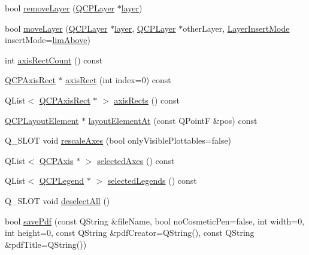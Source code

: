 \begin{DoxyCompactItemize}
\item 
bool \hyperlink{classQCustomPlot_a40f75e342c5eaab6a86066a42a0e2a94}{remove\-Layer} (\hyperlink{classQCPLayer}{\-Q\-C\-P\-Layer} $\ast$\hyperlink{classQCustomPlot_aac492da01782820454e9136a8db28182}{layer})
\item 
bool \hyperlink{classQCustomPlot_ae896140beff19424e9e9e02d6e331104}{move\-Layer} (\hyperlink{classQCPLayer}{\-Q\-C\-P\-Layer} $\ast$\hyperlink{classQCustomPlot_aac492da01782820454e9136a8db28182}{layer}, \hyperlink{classQCPLayer}{\-Q\-C\-P\-Layer} $\ast$other\-Layer, \hyperlink{classQCustomPlot_a75a8afbe6ef333b1f3d47abb25b9add7}{\-Layer\-Insert\-Mode} insert\-Mode=\hyperlink{classQCustomPlot_a75a8afbe6ef333b1f3d47abb25b9add7a062b0b7825650b432a713c0df6742d41}{lim\-Above})
\item 
int \hyperlink{classQCustomPlot_a340fa24b1607e445cedda9685670ead3}{axis\-Rect\-Count} () const 
\item 
\hyperlink{classQCPAxisRect}{\-Q\-C\-P\-Axis\-Rect} $\ast$ \hyperlink{classQCustomPlot_a4a37a1add5fe63060ac518cf0a4c4050}{axis\-Rect} (int index=0) const 
\item 
\-Q\-List$<$ \hyperlink{classQCPAxisRect}{\-Q\-C\-P\-Axis\-Rect} $\ast$ $>$ \hyperlink{classQCustomPlot_afd67094aaeccbc5719761348b2d8c891}{axis\-Rects} () const 
\item 
\hyperlink{classQCPLayoutElement}{\-Q\-C\-P\-Layout\-Element} $\ast$ \hyperlink{classQCustomPlot_a840458186d4483c8a42d6a399448d38f}{layout\-Element\-At} (const \-Q\-Point\-F \&pos) const 
\item 
\-Q\-\_\-\-S\-L\-O\-T void \hyperlink{classQCustomPlot_ad86528f2cee6c7e446dea4a6e8839935}{rescale\-Axes} (bool only\-Visible\-Plottables=false)
\item 
\-Q\-List$<$ \hyperlink{classQCPAxis}{\-Q\-C\-P\-Axis} $\ast$ $>$ \hyperlink{classQCustomPlot_aa6baf867e8beb96ed5bd471f83ece903}{selected\-Axes} () const 
\item 
\-Q\-List$<$ \hyperlink{classQCPLegend}{\-Q\-C\-P\-Legend} $\ast$ $>$ \hyperlink{classQCustomPlot_a1ea6297300c3e2770e65f95836411755}{selected\-Legends} () const 
\item 
\-Q\-\_\-\-S\-L\-O\-T void \hyperlink{classQCustomPlot_a9d4808ab925b003054085246c92a257c}{deselect\-All} ()
\item 
bool \hyperlink{classQCustomPlot_a632da44c6d94ea8b271eb483b08b5114}{save\-Pdf} (const \-Q\-String \&file\-Name, bool no\-Cosmetic\-Pen=false, int width=0, int height=0, const \-Q\-String \&pdf\-Creator=\-Q\-String(), const \-Q\-String \&pdf\-Title=\-Q\-String())

\end{DoxyCompactItemize}
